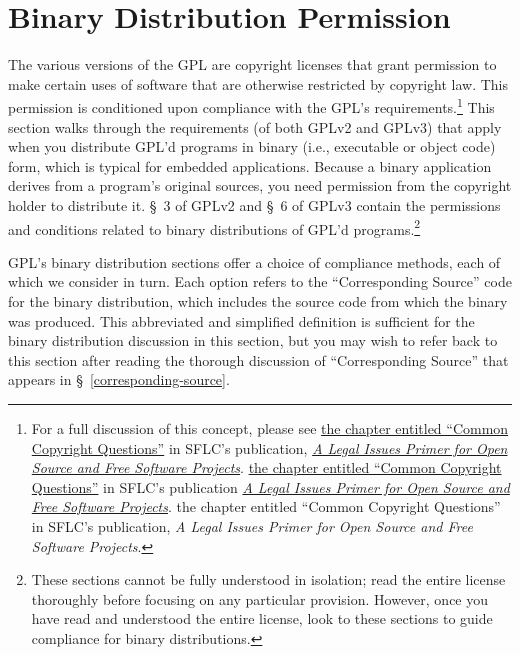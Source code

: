 \section{Binary Distribution Permission}
\label{binary-distribution-permission}


The various versions of the GPL are copyright licenses that grant
permission to make certain uses of software that are otherwise restricted
by copyright law.  This permission is conditioned upon compliance with the
GPL's requirements.\footnote{For a full discussion of this concept, please see
\ifpdf
\href{http://www.softwarefreedom.org/resources/2008/foss-primer.html\#x1-40002}{the
  chapter entitled ``Common Copyright Questions''} in SFLC's publication,
\href{http://www.softwarefreedom.org/resources/2008/foss-primer.pdf}{\textit{A
    Legal Issues Primer for Open Source and Free Software Projects}}.
\else
\ifx \generateHTML \isGeneratingHTML
\href{http://www.softwarefreedom.org/resources/2008/foss-primer.html\#x1-40002}{the
  chapter entitled ``Common Copyright Questions''} in SFLC's publication
\href{http://www.softwarefreedom.org/resources/2008/foss-primer.html}{\textit{A
    Legal Issues Primer for Open Source and Free Software Projects}}.
\else
the chapter entitled ``Common Copyright Questions'' in SFLC's publication,
\textit{A Legal Issues Primer for Open Source and Free Software
  Projects}.
\fi
\fi
}
This section walks through the requirements (of both GPLv2 and GPLv3) that
apply when you distribute GPL'd programs in binary (i.e., executable or
object code) form, which is typical for embedded applications.  Because a
binary application derives from a program's original sources, you need
permission from the copyright holder to distribute it.  \S~3 of GPLv2 and
\S~6 of GPLv3 contain the permissions and conditions related to binary
distributions of GPL'd programs.\footnote{These sections cannot be fully
  understood in isolation; read the entire license thoroughly before
  focusing on any particular provision.  However, once you have read and
  understood the entire license, look to these sections to guide
  compliance for binary distributions.}

GPL's binary distribution sections offer a choice of compliance methods,
each of which we consider in turn.  Each option refers to the
``Corresponding Source'' code for the binary distribution, which includes
the source code from which the binary was produced.  This abbreviated and
simplified definition is sufficient for the binary distribution discussion
in this section, but you may wish to refer back to this section after
reading the thorough discussion of ``Corresponding Source'' that appears
in \S~\ref{corresponding-source}.

